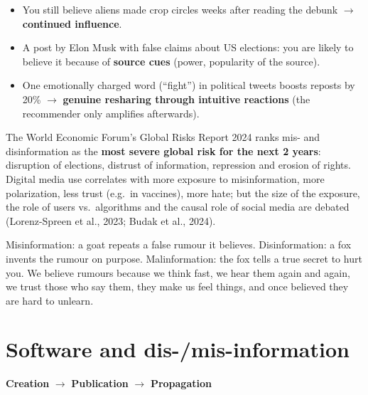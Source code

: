 \documentclass[11pt,a4paper,openany]{book}
\begin{document}
\begin{exbox}[title={Exam-type questions}]
\begin{itemize}
  \item You still believe aliens made crop circles weeks after reading the debunk $\to$
        \textbf{continued influence}.
  \item A post by Elon Musk with false claims about US elections: you are likely to believe it
        because of \textbf{source cues} (power, popularity of the source).
  \item One emotionally charged word (``fight'') in political tweets boosts reposts by 20\% $\to$
        \textbf{genuine resharing through intuitive reactions} (the recommender only amplifies
        afterwards).
\end{itemize}
\end{exbox}

\begin{keybox}[title={Why it matters at macro level}]
The World Economic Forum's Global Risks Report 2024 ranks mis- and disinformation as the
\textbf{most severe global risk for the next 2 years}: disruption of elections, distrust of
information, repression and erosion of rights. Digital media use correlates with more exposure to
misinformation, more polarization, less trust (e.g.\ in vaccines), more hate; but the size of the
exposure, the role of users vs.\ algorithms and the causal role of social media are debated
(Lorenz-Spreen et al., 2023; Budak et al., 2024).
\end{keybox}

\begin{goatbox}
Misinformation: a goat repeats a false rumour it believes. Disinformation: a fox invents the
rumour on purpose. Malinformation: the fox tells a true secret to hurt you. We believe rumours
because we think fast, we hear them again and again, we trust those who say them, they make us
feel things, and once believed they are hard to unlearn.
\end{goatbox}


\section{Software and dis-/mis-information}

\begin{defnbox}[title={The supply chain of false information (Zhou \& Zafarani, 2020)}]
\textbf{Creation} $\longrightarrow$ \textbf{Publication} $\longrightarrow$ \textbf{Propagation}
\end{defnbox}
\end{document}
